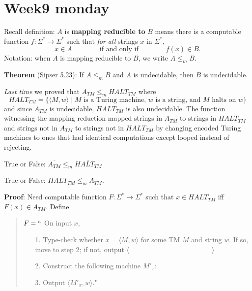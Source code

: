 \documentclass[12pt, oneside]{article}
\begin{document}
\begin{flushright}
\end{flushright} \section*{Week9 monday}



Recall definition:  $A$ is  {\bf  mapping  reducible to} $B$  means there is a computable function 
$f : \Sigma^* \to \Sigma^*$ such that {\it for all} strings  $x$ in $\Sigma^*$, 
\[
x  \in  A \qquad \qquad \text{if and  only  if} \qquad \qquad f(x) \in B.
\]
Notation:  when $A$  is mapping reducible to $B$, we write $A  \leq_m B$.

{\bf Theorem} (Sipser 5.23): If $A \leq_m B$ and $A$ is undecidable, then $B$ is undecidable.
    

{\it Last time} we proved that $A_{TM} \le_m HALT_{TM}$ where
    \[
    HALT_{TM} = \{ \langle M, w \rangle \mid \text{$M$ is a  Turing machine, $w$ is  a string, and $M$ halts on $w$} \}
    \]
and since $A_{TM}$ is undecidable, $HALT_{TM}$ is also undecidable. The function 
witnessing the mapping reduction mapped strings in $A_{TM}$ to strings in $HALT_{TM}$ and 
strings not in $A_{TM}$ to strings not in $HALT_{TM}$ by changing encoded Turing machines to 
ones that had identical computations except looped instead of rejecting.


True or False: $\overline{A_{TM}} \leq_m \overline{HALT_{TM}}$

\vfill

True or False: $HALT_{TM} \leq_m A_{TM}$.

{\bf Proof}: Need computable function  $F: \Sigma^* \to \Sigma^*$  such that  
$x \in HALT_{TM}$ iff $F(x)  \in  A_{TM}$.
Define

\vspace{-15pt}

\begin{quote}
$F =  ``$ On input $x$,
\begin{itemize}
\item[1.] Type-check whether  $x = \langle M, w \rangle$ for some TM $M$ and string $w$. 
If so, move to step 2; if  not, output  $\langle \hspace{2in} \rangle$
\item[2.] Construct the following machine $M'_x$:
\vspace{50pt}
\item[3.] Output $\langle M'_x , w\rangle$."
\end{itemize}
\end{quote}
\end{document}
